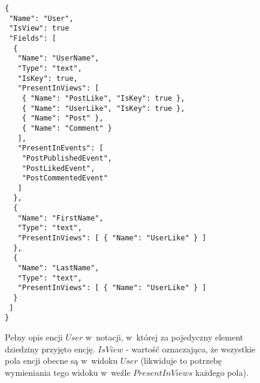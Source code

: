 \begin{figure}[!ht]
\begin{verbatim}
{
 "Name": "User",
 "IsView": true
 "Fields": [
  {
   "Name": "UserName",
   "Type": "text",
   "IsKey": true,
   "PresentInViews": [
    { "Name": "PostLike", "IsKey": true },
    { "Name": "UserLike", "IsKey": true },
    { "Name": "Post" },
    { "Name": "Comment" }
   ],
   "PresentInEvents": [
    "PostPublishedEvent",
    "PostLikedEvent",
    "PostCommentedEvent"
   ]
  },
  {
   "Name": "FirstName",
   "Type": "text",
   "PresentInViews": [ { "Name": "UserLike" } ]
  },
  {
   "Name": "LastName",
   "Type": "text",
   "PresentInViews": [ { "Name": "UserLike" } ]
  }
 ]
}
\end{verbatim}
\caption{
 Pełny opis encji $User$ w~notacji, w~której za pojedyczny element dziedziny przyjęto encję.
 $IsView$ - wartość oznaczająca, że wszystkie pola encji obecne są w~widoku $User$ (likwiduje to potrzebę wymieniania tego widoku w~weźle $PresentInViews$ każdego pola).
}
\label{fig:single:model_presentIn}
\end{figure}
